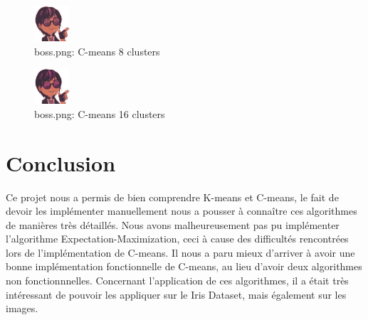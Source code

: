 \documentclass{article}
\begin{document}
  \begin{figure}
    \includegraphics[scale=2]{images/result_boss_c_8.png}
    \caption{boss.png: C-means 8 clusters}
    \label{fig:}
  \end{figure}

  \begin{figure}
    \includegraphics[scale=2]{images/result_boss_c_16.png}
    \caption{boss.png: C-means 16 clusters}
    \label{fig:}
  \end{figure}
  \fi

  \section{Conclusion}

  Ce projet nous a permis de bien comprendre K-means et C-means, le fait de devoir les implémenter
  manuellement nous a pousser à connaître ces algorithmes de manières très détaillés.
  Nous avons malheureusement pas pu implémenter l'algorithme Expectation-Maximization,
  ceci à cause des difficultés rencontrées lors de l'implémentation de C-means.
  Il nous a paru mieux d'arriver à avoir une bonne implémentation fonctionnelle de C-means,
  au lieu d'avoir deux algorithmes non fonctionnnelles.
  Concernant l'application de ces algorithmes,
  il a était très intéressant de pouvoir les appliquer sur le Iris Dataset, mais également sur les images.
\end{document}
